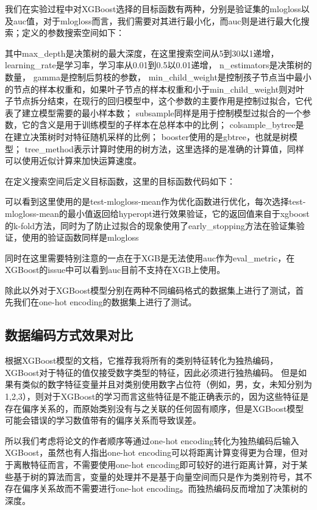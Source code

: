 我们在实验过程中对XGBoost选择的目标函数有两种，分别是验证集的mlogloss以及auc值，对于mlogloss而言，我们需要对其进行最小化，而auc则是进行最大化搜索；定义的参数搜索空间如下：




其中max\_depth是决策树的最大深度，在这里搜索空间从5到30以1递增，
learning\_rate是学习率，学习率从0.01到0.5以0.01递增，
n\_estimators是决策树的数量，
gamma是控制后剪枝的参数，
min\_child\_weight是控制孩子节点当中最小的节点的样本权重和，如果叶子节点的样本权重和小于min\_child\_weight则对叶子节点拆分结束，在现行的回归模型中，这个参数的主要作用是控制过拟合，它代表了建立模型需要的最小样本数；
subsample同样是用于控制模型过拟合的一个参数，它的含义是用于训练模型的子样本在总样本中的比例；
colsample\_bytree是在建立决策树时对特征随机采样的比例；
booster使用的是gbtree，也就是树模型；
tree\_method表示计算时使用的树方法，这里选择的是准确的计算值，同样可以使用近似计算来加快运算速度。

在定义搜索空间后定义目标函数，这里的目标函数代码如下：




可以看到这里使用的是test-mlogloss-mean作为优化函数进行优化，每次选择test-mlogloss-mean的最小值返回给hyperopt进行效果验证，它的返回值来自于xgboost的k-fold方法，同时为了防止过拟合的现象使用了early\_stopping方法在验证集验证，使用的验证函数同样是mlogloss

同时在这里需要特别注意的一点在于XGB是无法使用auc作为eval\_metric，在XGBoost的issue中可以看到auc目前不支持在XGB上使用。

除此以外对于XGBoost模型分别在两种不同编码格式的数据集上进行了测试，首先我们在one-hot encoding的数据集上进行了测试。

\subsection{数据编码方式效果对比}

根据XGBoost模型的文档，它推荐我将所有的类别特征转化为独热编码，XGBoost对于特征的值仅接受数字类型的特征，因此必须进行独热编码。 但是如果有类似的数字特征变量并且对类别使用数字占位符（例如，{男，女，未知}分别为{1,2,3}），则对于XGBoost的学习而言这些特征是不能正确表示的，因为这些特征是存在偏序关系的，而原始类别没有与之关联的任何固有顺序，但是XGBoost模型可能会错误的学习数值带有的偏序关系而导致误差。

所以我们考虑将论文的作者顺序等通过one-hot encoding转化为独热编码后输入XGBoost，虽然也有人指出one-hot encoding可以将距离计算变得更为合理，但对于离散特征而言，不需要使用one-hot encoding即可较好的进行距离计算，对于某些基于树的算法而言，变量的处理并不是基于向量空间而只是作为类别符号，其不存在偏序关系故而不需要进行one-hot encoding。而独热编码反而增加了决策树的深度。

